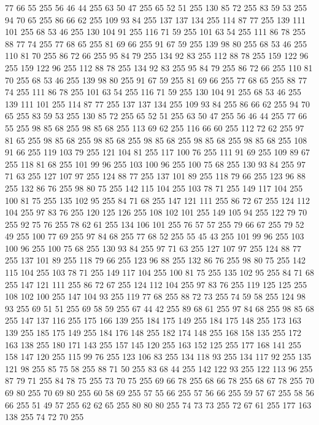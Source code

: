 77 66 55 255 56 46 44 255 63 50 47 255 65 52 51 255 130 85 72 255 83 59 53 255 94 70 65 255 86 66 62 255 109 93 84 255 137 137 134 255 114 87 77 255 139 111 101 255 68 53 46 255 130 104 91 255 116 71 59 255 101 63 54 255 111 86 78 255 88 77 74 255 77 68 65 255 81 69 66 255 91 67 59 255 139 98 80 255 68 53 46 255 110 81 70 255 86 72 66 255 95 84 79 255 134 92 83 255 112 88 78 255 159 122 96 255 159 122 96 255 112 88 78 255 134 92 83 255 95 84 79 255 86 72 66 255 110 81 70 255 68 53 46 255 139 98 80 255 91 67 59 255 81 69 66 255 77 68 65 255 88 77 74 255 111 86 78 255 101 63 54 255 116 71 59 255 130 104 91 255 68 53 46 255 139 111 101 255 114 87 77 255 137 137 134 255 109 93 84 255 86 66 62 255 94 70 65 255 83 59 53 255 130 85 72 255 65 52 51 255 63 50 47 255 56 46 44 255 77 66 55 255 98 85 68 255 98 85 68 255 113 69 62 255 116 66 60 255 112 72 62 255 97 81 65 255
98 85 68 255 98 85 68 255 98 85 68 255 98 85 68 255 98 85 68 255 108 91 66 255 119 103 79 255 121 104 81 255 117 100 76 255 111 91 69 255 109 89 67 255 118 81 68 255 101 99 96 255 103 100 96 255 100 75 68 255 130 93 84 255 97 71 63 255 127 107 97 255 124 88 77 255 137 101 89 255 118 79 66 255 123 96 88 255 132 86 76 255 98 80 75 255 142 115 104 255 103 78 71 255 149 117 104 255 100 81 75 255 135 102 95 255 84 71 68 255 147 121 111 255 86 72 67 255 124 112 104 255 97 83 76 255 120 125 126 255 108 102 101 255 149 105 94 255 122 79 70 255 92 75 76 255 78 62 61 255 134 106 101 255 76 57 57 255 79 66 67 255 79 52 49 255 100 77 69 255 97 84 68 255 77 68 52 255 55 45 43 255 101 99 96 255 103 100 96 255 100 75 68 255 130 93 84 255 97 71 63 255 127 107 97 255 124 88 77 255 137 101 89 255 118 79 66 255 123 96 88 255 132 86 76 255 98 80 75 255 142 115 104 255 103 78 71 255 149 117 104 255 100 81 75 255
135 102 95 255 84 71 68 255 147 121 111 255 86 72 67 255 124 112 104 255 97 83 76 255 119 125 125 255 108 102 100 255 147 104 93 255 119 77 68 255 88 72 73 255 74 59 58 255 124 98 93 255 69 51 51 255 69 58 59 255 67 44 42 255 89 68 61 255 97 84 68 255 98 85 68 255 147 137 116 255 175 166 139 255 184 175 149 255 184 175 148 255 173 163 139 255 185 175 149 255 184 176 148 255 182 174 148 255 168 158 135 255 172 163 138 255 180 171 143 255 157 145 120 255 163 152 125 255 177 168 141 255 158 147 120 255 115 99 76 255 123 106 83 255 134 118 93 255 134 117 92 255 135 121 98 255 85 75 58 255 88 71 50 255 83 68 44 255 142 122 93 255 122 113 96 255 87 79 71 255 84 78 75 255 73 70 75 255 69 66 78 255 68 66 78 255 68 67 78 255 70 69 80 255 70 69 80 255 60 58 69 255 57 55 66 255 57 56 66 255 59 57 67 255 58 56 66 255 51 49 57 255 62 62 65 255 80 80 80 255 74 73 73 255 72 67 61 255 177 163 138 255 74 72 70 255
